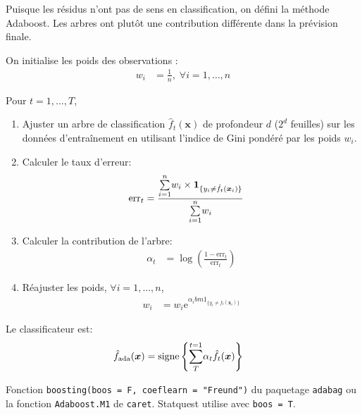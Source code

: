 \documentclass[10pt, french]{article}
\begin{document}
\begin{multicols*}{3}
\begin{definitionNOHFILL}
Puisque les résidus n'ont pas de sens en classification, on défini la méthode Adaboost. 
Les arbres ont plutôt une contribution différente dans la prévision finale.
\end{definitionNOHFILL}

\begin{algo2}
On initialise les poids des observations :
\begin{align*}
	w_{i}	&=	\frac{1}{n}, \;	\forall i = 1, \dots, n
\end{align*}

Pour $t = 1, \dots, T$,
\begin{enumerate}[leftmargin  = *]
	\item	Ajuster un arbre de classification $\hat{f}_{t}(\bm{x})$ de profondeur $d$ ($2^{d}$ feuilles) sur les données d'entraînement en utilisant l'indice de Gini pondéré par les poids $w_{i}$.
	\item	Calculer le taux d'erreur:
		\begin{align*}
		\text{err}_{t}	
		&=	\frac{\overset{n}{\underset{i = 1}{\sum}} w_{i} \times \bm{1}_{\{ y_{i} \neq \hat{f}_{t}(\bm{x}_{i}) \}}}{\overset{n}{\underset{i = 1}{\sum}} w_{i}}
		\end{align*}
	\item	Calculer la contribution de l'arbre:
		\begin{align*}
			\alpha_{t}	
			&=	\log(\frac{1 - \text{err}_{t}}{\text{err}_{t}})
		\end{align*}
	\item	Réajuster les poids, $\forall i = 1, \dots, n$,
		\begin{align*}
		w_{i}
		&=	w_{i} \text{e}^{\alpha_{i} bm{1}_{\{ y_{i} \neq \hat{f}_{t}(\bm{x}_{i}) \}}}
		\end{align*}
\end{enumerate}

Le classificateur est:
\begin{align*}
	\hat{f}_{\text{ada}}(\bm{x})	
	&=	\text{signe}\left\{ \overset{t = 1}{\underset{T}{\sum}} \alpha_{t} \hat{f}_{t} (\bm{x}) \right\}
\end{align*}
\end{algo2}

\begin{definitionNOHFILLsub}
Fonction \texttt{boosting(boos = F, coeflearn = "Freund")} du paquetage \texttt{adabag} ou la fonction \texttt{Adaboost.M1} de \texttt{caret}. Statquest utilise avec \texttt{boos = T}.
\end{definitionNOHFILLsub}


\end{multicols*}
\end{document}
